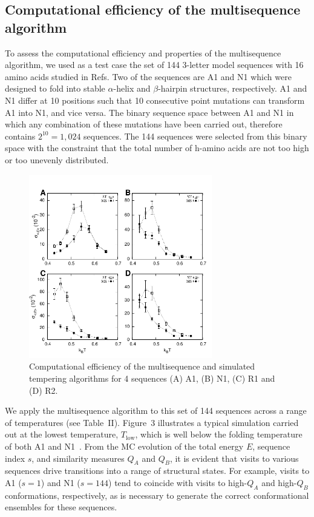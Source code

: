 \documentclass[%
 aip,
rsi,%
 amsmath,amssymb,
 reprint,%
]{revtex4-1}
\newcommand	 {\sbar}	{{s}}
\newcommand	 {\Tlow}	{{T_\mathrm{low}}}
\begin{document}
\subsection{Computational efficiency of the multisequence algorithm}
\noindent
To assess the computational efficiency and properties of the multisequence algorithm, we used as a test case the set of 144 3-letter model sequences with 16 amino acids studied in Refs.\cite{Holzgrafe2014} Two of the sequences are A1 and N1 which were designed to fold into stable $\alpha$-helix and $\beta$-hairpin structures, respectively. A1 and N1 differ at 10 positions such that 10 consecutive point mutations can transform A1 into N1, and vice versa. The binary sequence space between A1 and N1 in which any combination of these mutations have been carried out, therefore contains $2^{10}=1,024$ sequences. The 144 sequences were selected from this binary space with the constraint that the total number of h-amino acids are not too high or too unevenly distributed.~\cite{Holzgrafe2014}

\begin{figure}
\includegraphics[width=8.0cm]{Stderr}
\caption{Computational efficiency of the multisequence and simulated tempering algorithms for 4 sequences (A) A1, (B) N1, (C) R1 and (D) R2.}
\end{figure}


We apply the multisequence algorithm to this set of 144 sequences across a range of temperatures (see Table~II). Figure~3 illustrates a typical simulation carried out at the lowest temperature, $\Tlow$, which is well below the folding temperature of both A1 and N1~\cite{Holzgrafe2014,Holzgrafe2015}. From the MC evolution of the total energy $E$, sequence index $\sbar$, and similarity measures $Q_A$ and $Q_B$, it is evident that visits to various sequences drive transitions into a range of structural states. For example, visits to A1 ($\sbar=1$) and N1 ($\sbar=144$) tend to coincide with visits to high-$Q_A$ and high-$Q_B$ conformations, respectively, as is necessary to generate the correct conformational ensembles for these sequences.
\end{document}
